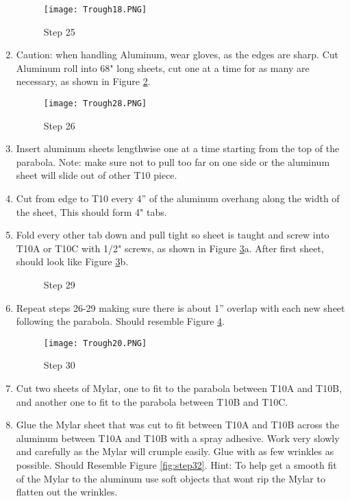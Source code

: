 \documentclass[11pt,english]{article}
\begin{document}
\begin{enumerate}
\begin{figure}[ht!]
\centering
\texttt{[image: Trough18.PNG]}
\caption{Step 25}
\label{fig:step25}
\end{figure}

\item   Caution: when handling Aluminum, wear gloves, as the edges are sharp. Cut Aluminum roll into 68" long sheets, cut one at a time for as many are necessary, as shown in Figure \ref{fig:step26}.

\begin{figure}[ht!]
\centering
\texttt{[image: Trough28.PNG]}
\caption{Step 26}
\label{fig:step26}
\end{figure}

\newpage
\item   Insert aluminum sheets lengthwise one at a time starting from the top of the parabola. Note: make sure not to pull too far on one side or the aluminum sheet will slide out of other T10 piece.   
\item   Cut from edge to T10 every 4” of the aluminum overhang along the width of the sheet, This should form 4" tabs.
\item   Fold every other tab down and pull tight so sheet is taught and screw into T10A or T10C with 1/2" screws, as shown in Figure \ref{fig:step29}a. After first sheet, should look like Figure \ref{fig:step29}b.

\begin{figure}[ht!]%
    \centering
    \qquad
    \caption{Step 29}%
    \label{fig:step29}%
\end{figure}

\item   Repeat steps 26-29 making sure there is about 1” overlap with each new sheet following the parabola. Should resemble Figure \ref{fig:step30}. 

\begin{figure}[ht!]
\centering
\texttt{[image: Trough20.PNG]}
\caption{Step 30}
\label{fig:step30}
\end{figure}
\newpage
\item  	Cut two sheets of Mylar\textsuperscript{\textregistered}, one to fit to the parabola between T10A and T10B, and another one to fit to the parabola between T10B and T10C. 
\item   Glue the Mylar\textsuperscript{\textregistered} sheet that was cut to fit between T10A and T10B across the aluminum between T10A and T10B with a spray adhesive. Work very slowly and carefully as the Mylar will crumple easily. Glue with as few wrinkles as possible. Should Resemble Figure \ref{fig:step32}. Hint: To help get a smooth fit of the Mylar to the aluminum use soft objects that wont rip the Mylar to flatten out the wrinkles. 


\end{enumerate}
\end{document}
